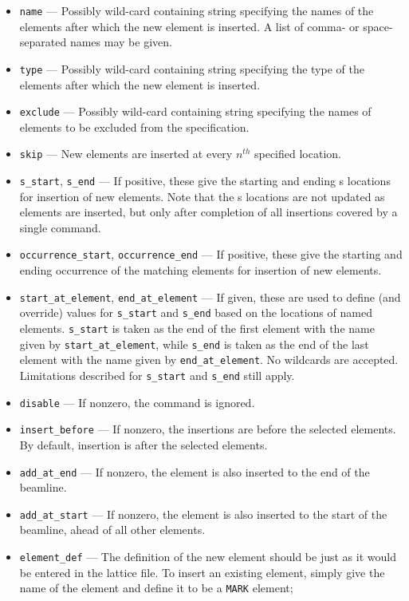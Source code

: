 \documentclass[11pt]{article}
\begin{document}
\begin{itemize}
\item \verb|name| --- Possibly wild-card containing string specifying the
   names of the elements after which the new element is inserted. A list of comma- or space-separated names may be given.
\item \verb|type| --- Possibly wild-card containing string specifying the
   type of the elements after which the new element is inserted.
\item \verb|exclude| --- Possibly wild-card containing string specifying 
   the names of elements to be excluded from the specification.
\item \verb|skip| --- New elements are inserted at every $n^{th}$ specified location.
\item \verb|s_start|, \verb|s_end| --- If positive, these give the starting and ending s locations for insertion of new elements.
  Note that the s locations are not updated as elements are inserted, but only after completion of all insertions covered by
  a single command.
\item \verb|occurrence_start|, \verb|occurrence_end| --- If positive, these give the starting and ending occurrence of the
  matching elements for  insertion of new elements.
\item \verb|start_at_element|, \verb|end_at_element| --- If given, these are used to define (and override) values for \verb|s_start| and
  \verb|s_end| based on the locations of named elements. \verb|s_start| is taken as the end of the first element with the name given
  by \verb|start_at_element|, while \verb|s_end| is taken as the end of the last element with the name given by
  \verb|end_at_element|. No wildcards are accepted. Limitations described for \verb|s_start| and \verb|s_end| still apply.
\item \verb|disable| --- If nonzero, the command is ignored.
\item \verb|insert_before| --- If nonzero, the insertions are before the selected elements. By default, insertion is after
  the selected elements.
\item \verb|add_at_end| --- If nonzero, the element is also inserted to the end of the beamline.
\item \verb|add_at_start| --- If nonzero, the element is also inserted to the start of the beamline, ahead of all other elements.
\item \verb|element_def| --- The definition of the new element should be just as it would be entered in 
the lattice file. To insert an existing element, simply give the name of the element and define it to be a \verb|MARK| element;

\end{itemize}
\end{document}

